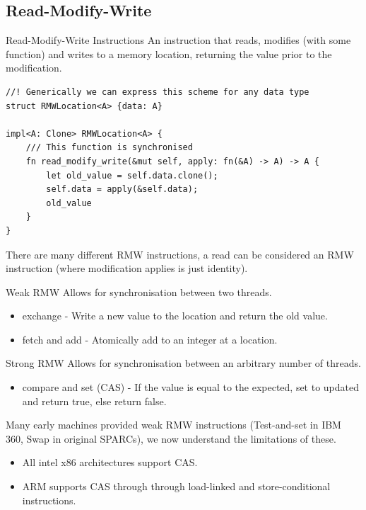 \subsection{Read-Modify-Write}
\begin{definitionbox}{Read-Modify-Write Instructions}
	An instruction that reads, modifies (with some function) and writes to a memory location, returning the value prior to the modification.
	\begin{verbatim}
//! Generically we can express this scheme for any data type
struct RMWLocation<A> {data: A}

impl<A: Clone> RMWLocation<A> {
    /// This function is synchronised
    fn read_modify_write(&mut self, apply: fn(&A) -> A) -> A {
        let old_value = self.data.clone();
        self.data = apply(&self.data);
        old_value
    }
}
    \end{verbatim}
\end{definitionbox}
There are many different RMW instructions, a read can be considered an RMW instruction (where modification applies is just identity).
\begin{tcbraster}[raster columns=2, raster equal height]
	\begin{definitionbox}{Weak RMW}
		Allows for synchronisation between two threads.
		\begin{itemize}
			\item exchange - Write a new value to the location and return the old value.
			\item fetch and add - Atomically add to an integer at a location. \\
		\end{itemize}
	\end{definitionbox}
	\begin{definitionbox}{Strong RMW}
		Allows for synchronisation between an arbitrary number of threads.
		\begin{itemize}
			\item compare and set (CAS) - If the value is equal to the expected, set to updated and return true, else return false.
		\end{itemize}
	\end{definitionbox}
\end{tcbraster}
Many early machines provided weak RMW instructions (Test-and-set in IBM 360, Swap in original SPARCs), we now understand the limitations of these.
\begin{itemize}
	\item All intel x86 architectures support CAS.
	\item ARM supports CAS through through load-linked and store-conditional instructions.
\end{itemize}

